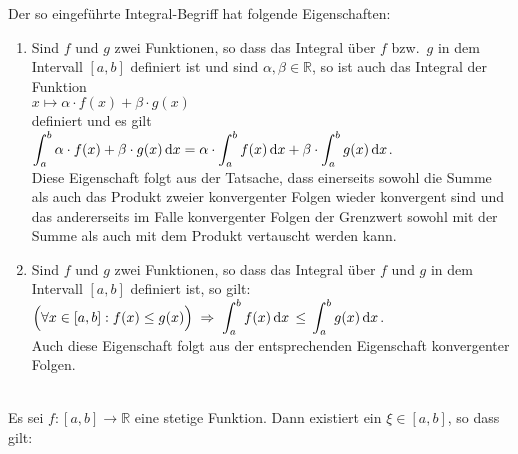 \noindent
Der so eingef\"uhrte Integral-Begriff hat folgende Eigenschaften:
\begin{enumerate}
\item {} Sind $f$ und $g$ zwei Funktionen, so dass
      das Integral \"uber $f$ bzw.~$g$ in dem Inter\-vall $[a,b]$ definiert ist
      und sind $\alpha,\beta \in\mathbb{R}$,
      so ist auch das Integral der Funktion
      \\[0.2cm]
      \hspace*{1.3cm} $x \mapsto \alpha\cdot f(x) + \beta\cdot g(x)$ \\[0.2cm]
      definiert und es gilt 
      \\[0.2cm]
      \hspace*{1.3cm}
      $\displaystyle\int_a^b \alpha\cdot f(x) + \beta\cdot g(x)\,\textrm{d} x = \alpha\cdot \int_a^b f(x)\,\textrm{d} x + \beta\cdot \int_a^b g(x)\,\textrm{d} x$.
      \\[0.2cm]
      Diese Eigenschaft folgt aus der Tatsache, dass einerseits sowohl die Summe als auch das
      Produkt zweier konvergenter Folgen wieder konvergent sind und das andererseits im Falle
      konvergenter Folgen der Grenzwert sowohl mit der Summe als auch mit dem Produkt vertauscht
      werden kann.
\item {}  Sind $f$ und $g$ zwei Funktionen, so dass
      das Integral \"uber $f$ und  $g$ in dem Intervall $[a,b]$ definiert ist, so gilt: 
      \\[0.2cm]
      \hspace*{1.3cm}
      $\displaystyle\Bigl(\forall x \in [a,b]: f(x) \leq g(x)\Bigr) \;\Rightarrow\;
       \int_a^b f(x)\, \textrm{d} x \,\leq\, \int_a^b g(x)\, \textrm{d} x$.
      \\[0.2cm] 
      Auch diese Eigenschaft folgt aus der entsprechenden Eigenschaft konvergenter Folgen.
\end{enumerate}


\begin{Satz} \hspace*{\fill} \\
Es sei $f:[a,b] \rightarrow \mathbb{R}$ eine stetige Funktion. Dann existiert ein $\xi \in [a,b]$, so dass gilt:
\\[0.2cm]
\hspace*{1.3cm}
\colorbox{red}{\colorbox{orange}{}}
\end{Satz}

